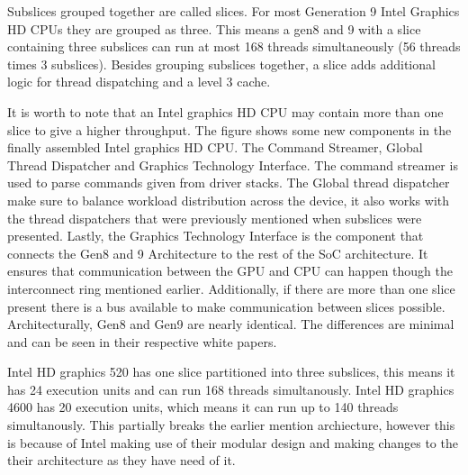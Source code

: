 Subslices grouped together are called slices. For most Generation 9 Intel Graphics HD \glspl{CPU} they are grouped as three.
This means a gen8 and 9 with a slice containing three subslices can run at most 168 threads simultaneously (56 threads times 3 subslices).
Besides grouping subslices together, a slice adds additional logic for thread dispatching and a level 3 cache.

It is worth to note that an Intel graphics HD \gls{CPU} may contain more than one slice to give a higher throughput.
The figure shows some new components in the finally assembled Intel graphics HD \gls{CPU}. The Command Streamer, Global Thread Dispatcher and Graphics Technology Interface.
The command streamer is used to parse commands given from driver stacks. 
The Global thread dispatcher make sure to balance workload distribution across the device, it also works with the thread dispatchers that were previously mentioned when subslices were presented.
Lastly, the Graphics Technology Interface is the component that connects the Gen8 and 9 Architecture to the rest of the SoC architecture. 
It ensures that communication between the \gls{GPU} and \gls{CPU} can happen though the interconnect ring mentioned earlier.  
Additionally, if there are more than one slice present there is a bus available to make communication between slices possible. 
Architecturally, Gen8 \cite{computegen8} and Gen9 \cite{computegen9} are nearly identical. The differences are minimal and can be seen in their respective white papers. 

Intel HD graphics 520 has one slice partitioned into three subslices, this means it has 24 execution units and can run 168 threads simultanously.
Intel HD graphics 4600 has 20 execution units, which means it can run up to 140 threads simultanously. 
This partially breaks the earlier mention archiecture, however this is because of Intel making use of their modular design and making changes to the their architecture as they have need of it.
